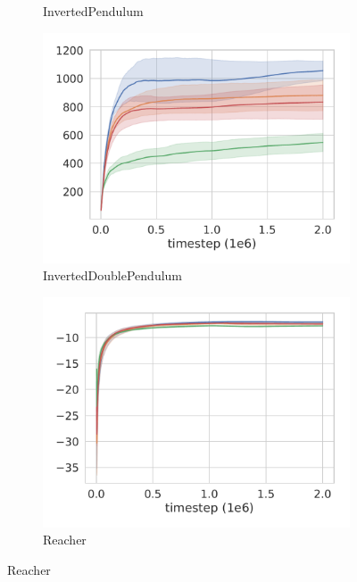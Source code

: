 \documentclass{article}
\begin{document}
\begin{figure}
\begin{subfigure}[b]{0.25\textwidth}
    \caption{InvertedPendulum}
    \vspace{15pt}
  \end{subfigure}%
  \begin{subfigure}[b]{0.25\textwidth}
    \includegraphics[width=\textwidth]{InvertedDoublePendulum-v2.pdf}
    \caption{InvertedDoublePendulum}
    \vspace{15pt}
  \end{subfigure}%
  \begin{subfigure}[b]{0.25\textwidth}
    \includegraphics[width=\textwidth]{Reacher-v2.pdf}
    \caption{Reacher}
    \vspace{15pt}
  \end{subfigure}%
  

\end{figure}
\end{document}

